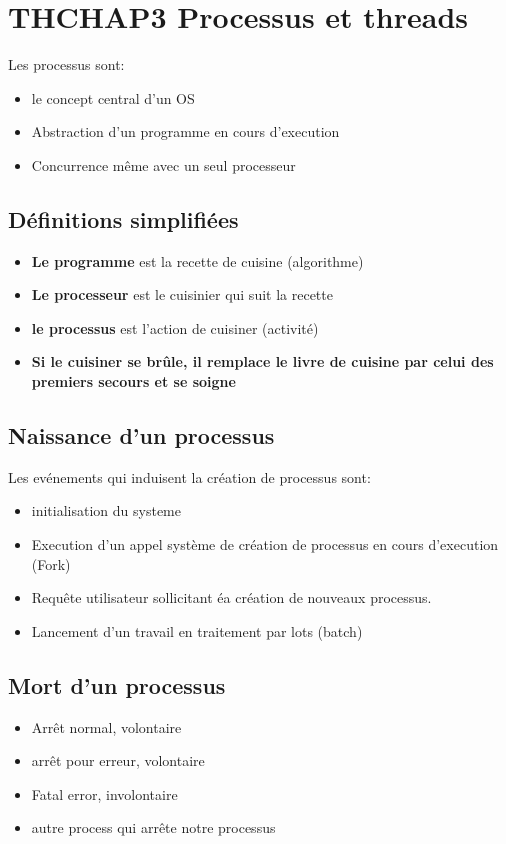 \newpage
\section{THCHAP3 Processus et threads}%

Les processus sont:

\begin{itemize}
    \item le concept central d'un OS
    \item Abstraction d'un programme en cours d'execution
    \item Concurrence même avec un seul processeur
\end{itemize}

\subsection{Définitions simplifiées}
\begin{itemize}
    \item \textbf{Le programme} est la recette de cuisine (algorithme)
    \item \textbf{Le processeur} est le cuisinier qui suit la recette
    \item \textbf{le processus} est l’action de cuisiner (activité)
    \item \textbf{Si le cuisiner se brûle, il remplace le livre de cuisine par celui des premiers secours et se soigne}
\end{itemize}

\subsection{Naissance d'un processus}

Les evénements qui induisent la création de processus sont:
\begin{itemize}
    \item initialisation du systeme
    \item Execution d'un appel système de création de processus en cours d'execution (Fork)
    \item Requête utilisateur sollicitant éa création de nouveaux processus.
    \item Lancement d'un travail en traitement par lots (batch)
\end{itemize}

\subsection{Mort d'un processus}
\begin{itemize}
    \item Arrêt normal, volontaire
    \item arrêt pour erreur, volontaire
    \item Fatal error, involontaire
    \item autre process qui arrête notre processus
\end{itemize}

